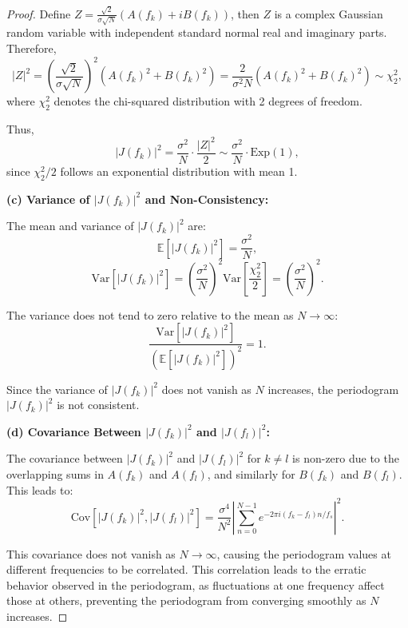 \documentclass[11pt]{article}
\begin{document}
\begin{solution}
\begin{proof}
    Define \(Z = \frac{\sqrt{2}}{\sigma \sqrt{N}} (A(f_k) + i B(f_k))\), then \(Z\) is a complex Gaussian random variable with independent standard normal real and imaginary parts. Therefore,
    \[
    |Z|^2 = \left(\frac{\sqrt{2}}{\sigma \sqrt{N}}\right)^2 (A(f_k)^2 + B(f_k)^2) = \frac{2}{\sigma^2 N} (A(f_k)^2 + B(f_k)^2) \sim \chi^2_2,
    \]
    where \(\chi^2_2\) denotes the chi-squared distribution with 2 degrees of freedom.
    
    Thus,
    \[
    |J(f_k)|^2 = \frac{\sigma^2}{N} \cdot \frac{|Z|^2}{2} \sim \frac{\sigma^2}{N} \cdot \text{Exp}(1),
    \]
    since \(\chi^2_2/2\) follows an exponential distribution with mean 1.
    
    \textbf{(c) Variance of \(|J(f_k)|^2\) and Non-Consistency:}
    
    The mean and variance of \(|J(f_k)|^2\) are:
    \[
    \mathbb{E}[|J(f_k)|^2] = \frac{\sigma^2}{N},
    \]
    \[
    \text{Var}[|J(f_k)|^2] = \left(\frac{\sigma^2}{N}\right)^2 \text{Var}\left[\frac{\chi^2_2}{2}\right] = \left(\frac{\sigma^2}{N}\right)^2.
    \]
    
    The variance does not tend to zero relative to the mean as \(N \to \infty\):
    \[
    \frac{\text{Var}[|J(f_k)|^2]}{\left(\mathbb{E}[|J(f_k)|^2]\right)^2} = 1.
    \]
    
    Since the variance of \(|J(f_k)|^2\) does not vanish as \(N\) increases, the periodogram \(|J(f_k)|^2\) is not consistent.
    
    \textbf{(d) Covariance Between \(|J(f_k)|^2\) and \(|J(f_l)|^2\):}
    
    The covariance between \(|J(f_k)|^2\) and \(|J(f_l)|^2\) for \(k \ne l\) is non-zero due to the overlapping sums in \(A(f_k)\) and \(A(f_l)\), and similarly for \(B(f_k)\) and \(B(f_l)\). This leads to:
    \[
    \text{Cov}[|J(f_k)|^2, |J(f_l)|^2] = \frac{\sigma^4}{N^2} \left| \sum_{n=0}^{N-1} e^{-2\pi i (f_k - f_l) n / f_s} \right|^2.
    \]
    
    This covariance does not vanish as \(N \to \infty\), causing the periodogram values at different frequencies to be correlated. This correlation leads to the erratic behavior observed in the periodogram, as fluctuations at one frequency affect those at others, preventing the periodogram from converging smoothly as \(N\) increases.
    \end{proof}
        
    \end{solution}
    
\end{document}
